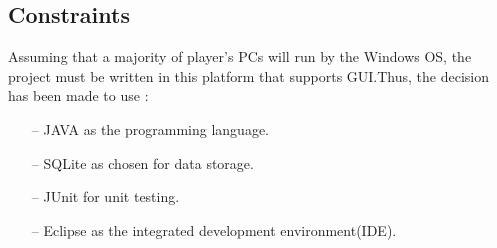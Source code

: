 \documentclass[10pt, a4paper]{article}
\begin{document}
%		
%		
%		
%		
%	
%		
	
	\subsection{Constraints}
	
	Assuming that a majority of player's PCs will run by the Windows OS, the project must be written in this platform that supports GUI.Thus, the decision has been made to use :
	\begin{itemize}
		\item[--] JAVA as the programming language.
		\item[--] SQLite as chosen for data storage.
		\item[--] JUnit for unit testing.
		\item[--] Eclipse as the integrated development environment(IDE).
	\end{itemize}
	
\end{document}
